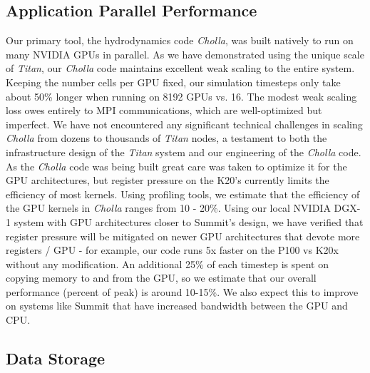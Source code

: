 \documentclass[11pt,letterpaper,english]{article}
\begin{document}
\subsection{Application Parallel Performance} 

Our primary tool, the hydrodynamics code \textit{Cholla}, was built natively to run on many NVIDIA GPUs
in parallel. As we have demonstrated using the unique scale of \textit{Titan}, our \textit{Cholla} code
maintains excellent weak scaling to the entire system. Keeping the number cells per GPU fixed, our simulation
timesteps only take about 50\% longer when running on 8192 GPUs vs. 16. The modest weak scaling loss owes
entirely to MPI communications, which are well-optimized but imperfect. We have not encountered any 
significant technical challenges in scaling \textit{Cholla} from dozens to thousands of \textit{Titan} nodes,
a testament to both the infrastructure design of the \textit{Titan} system and our engineering of the
\textit{Cholla} code. As the \textit{Cholla} code was being built great care was taken to optimize it for the GPU architectures, but register pressure on the K20's currently limits the efficiency of most kernels.
Using profiling tools, we estimate that the efficiency of the GPU kernels in \textit{Cholla} ranges from 10 - 20\%. Using our local NVIDIA DGX-1 system with GPU architectures closer to Summit's design, we have verified that register pressure will be mitigated on newer GPU architectures that devote more registers / GPU - for example, our code runs 5x faster on the P100 vs K20x without any modification.
An additional 25\% of each timestep is spent on copying memory to and from the GPU, so we estimate that our overall performance (percent of peak) is around 10-15\%. We also expect this to improve on systems like Summit
that have increased bandwidth between the GPU and CPU.


\subsection{Data Storage} 
\end{document}
